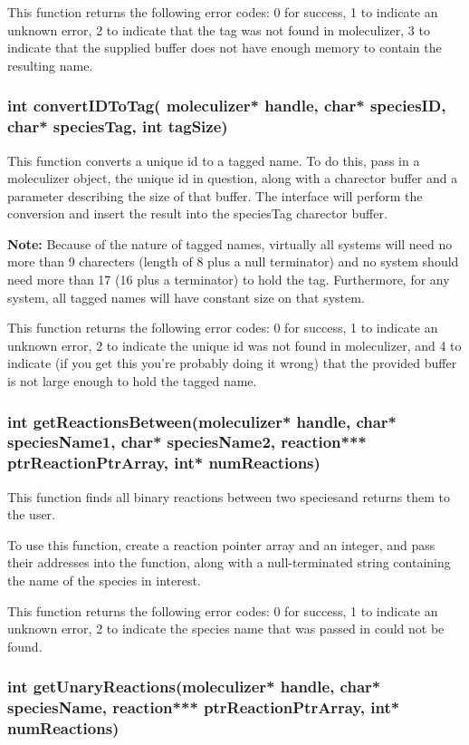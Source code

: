 This function returns the following error codes: 0 for success, 1 to
indicate an unknown error, 2 to indicate that the tag was not found in
moleculizer, 3 to indicate that the supplied buffer does not have
enough memory to contain the resulting name.

\subsubsection{int convertIDToTag( moleculizer* handle, char*
  speciesID, char* speciesTag, int tagSize)}
This function converts a unique id to a tagged name.  To do this, pass
in a moleculizer object, the unique id in question, along with a
charector buffer and a parameter describing the size of that buffer.
The interface will perform the conversion and insert the result into
the speciesTag charector buffer.

\textbf{Note:} Because of the nature of tagged names, virtually all
systems will need no more than 9 charecters (length of 8 plus a null
terminator) and no system should need more than 17 (16 plus a
terminator) to hold the tag.  Furthermore, for any system, all tagged
names will have constant size on that system. 

This function returns the following error codes: 0 for success, 1 to
indicate an unknown error, 2 to indicate the unique id was not found
in moleculizer, and 4 to indicate (if you get this you're probably
doing it wrong) that the provided buffer is not large enough to hold
the tagged name.

\subsubsection{int getReactionsBetween(moleculizer* handle, char*
  speciesName1, char* speciesName2, reaction*** ptrReactionPtrArray,
  int* numReactions)}

This function finds all binary reactions between two speciesand returns them to the user.

To use this function, create a reaction pointer array and an integer,
and pass their addresses into the function, along with a
null-terminated string containing the name of the species in
interest.  

This function returns the following error codes: 0 for success, 1 to
indicate an unknown error, 2 to indicate the species name that was
passed in could not be found.



\subsubsection{int getUnaryReactions(moleculizer* handle, char*
  speciesName, reaction*** ptrReactionPtrArray, int* numReactions)}

